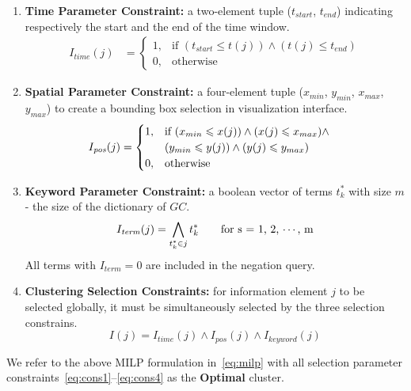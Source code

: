 \begin{enumerate}
\item {\bf Time Parameter Constraint:} a two-element tuple ($t_{start}$, $t_{end}$) indicating respectively the start and the end of the time window.
\begin{equation}
\begin{aligned}
  I_{\mathit{time}}(j) &=
   \begin{cases}
     1, & \text{if $(t_{start} \leqslant t(j)) \land (t(j) \leqslant t_{end})$}  \\
     0, & \text{otherwise}
  \end{cases} \label{eq:cons1}
\end{aligned}
\end{equation}

\item {\bf Spatial Parameter Constraint:} a four-element tuple ($x_{min}$, $y_{min}$, $x_{max}$, $y_{max}$) to create a bounding box selection in visualization interface.
\begin{equation}
\begin{aligned}
I_{\mathit{pos}}(j) & =\begin{cases}
1, & \text{if \ensuremath{(x_{min}\leqslant x(j))\land(x(j)\leqslant x_{max})\land}}\\
 & (y_{min}\leqslant y(j))\land(y(j)\leqslant y_{max})\\
0, & \text{otherwise}
\end{cases} \label{eq:cons2}
\end{aligned}
\end{equation}

\item {\bf Keyword Parameter Constraint:} a boolean vector of terms $t^*_k$ with size $m$ - the size of the dictionary of $GC$.
\begin{equation}
  I_{\mathit{term}}(j) = \bigwedge_{t^*_k \in j} t^*_k \qquad \textnormal{for s = 1, 2, $\cdots$, m} \label{eq:cons3}
\end{equation}
All terms with $I_{\mathit{term}}=0$ are included in the negation query.


\item {\bf Clustering Selection Constraints:} for information element $j$ to be selected globally, it must be simultaneously selected by the three selection constrains.
\begin{equation}
  I(j) = I_{\mathit{time}}(j) \land I_{\mathit{pos}}(j) \land I_{\mathit{keyword}}(j) \label{eq:cons4}
\end{equation}

\end{enumerate}
We refer to the above MILP formulation in~\eqref{eq:milp} with all selection parameter constraints~\eqref{eq:cons1}--\eqref{eq:cons4} as the {\bf Optimal} cluster.

